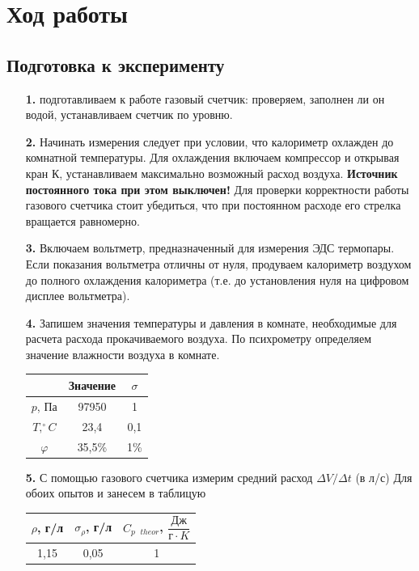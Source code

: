 \documentclass[a4paper, 12pt]{article}%
\begin{document}
\section*{Ход работы}
\subsection*{Подготовка к эксперименту}
\begin{enumerate}
\item [\textbf{1.}] подготавливаем к работе газовый счетчик: проверяем, заполнен ли он водой, устанавливаем счетчик по уровню.
\item [\textbf{2.}] Начинать измерения следует при условии, что калориметр охлажден до комнатной температуры. Для охлаждения включаем компрессор и открывая кран К, устанавливаем максимально возможный расход воздуха. \textbf{Источник постоянного тока при этом выключен!}
Для проверки корректности работы газового счетчика стоит убедиться, что при постоянном расходе его стрелка вращается равномерно.
\item [\textbf{3.}] Включаем вольтметр, предназначенный для измерения ЭДС термопары. Если показания вольтметра отличны от нуля, продуваем калориметр воздухом до полного охлаждения калориметра (т.е. до установления нуля на цифровом дисплее вольтметра).
\item [\textbf{4.}]Запишем значения температуры и давления в комнате, необходимые для расчета расхода прокачиваемого воздуха. По психрометру определяем значение влажности воздуха в комнате.
\begin{center}
    \begin{tabular}{|c|c|c|}
\hline
               & Значение & $\sigma$ \\ \hline
$p$, Па        & 97950    & 1        \\ \hline
$T, ^{\circ}C$ & 23,4     & 0,1      \\ \hline
$\varphi$         & 35,5\%     & 1\%      \\ \hline
\end{tabular}
  \end{center}
\item [\textbf{5.}] С помощью газового счетчика измерим средний расход $\Delta V/ \Delta t$ (в л/с) Для обоих опытов и занесем в таблицую
\begin{center}
\begin{tabular}{|c|c|c|}
\hline
$\rho$, г/л & $\sigma_{\rho}$, г/л & $C_{p \text{ } theor}$, $\dfrac{\text{Дж}}{\text{г}\cdot K}$ \\\hline
1,15      & 0,05               & 1                                           \\ \hline
\end{tabular}


\end{center}
\end{enumerate}
\end{document}
